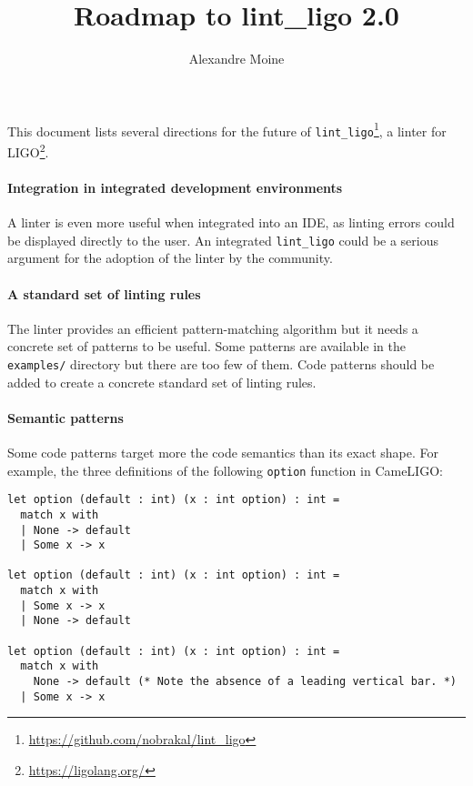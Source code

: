 \documentclass[10pt,a4paper]{article}
\author{Alexandre Moine}
\title{Roadmap to lint\_ligo 2.0}
\begin{document}
\maketitle

This document lists several directions for the future of
\verb|lint_ligo|\footnote{\url{https://github.com/nobrakal/lint_ligo}},
a linter for LIGO\footnote{\url{https://ligolang.org/}}.

\paragraph{Integration in integrated development environments}

A linter is even more useful when integrated into an IDE, as linting
errors could be displayed directly to the user.
%
An integrated \verb|lint_ligo| could be a serious argument for the
adoption of the linter by the community.


\paragraph{A standard set of linting rules}

The linter provides an efficient pattern-matching algorithm but it
needs a concrete set of patterns to be useful. Some patterns are
available in the \verb|examples/| directory but there are too few of
them. Code patterns should be added to create a concrete standard set
of linting rules.

\paragraph{Semantic patterns}
Some code patterns target more the code semantics than its exact
shape. For example, the three definitions of the following
\verb|option| function in CameLIGO:

\begin{verbatim}
let option (default : int) (x : int option) : int =
  match x with
  | None -> default
  | Some x -> x

let option (default : int) (x : int option) : int =
  match x with
  | Some x -> x
  | None -> default

let option (default : int) (x : int option) : int =
  match x with
    None -> default (* Note the absence of a leading vertical bar. *)
  | Some x -> x
\end{verbatim}
\end{document}
